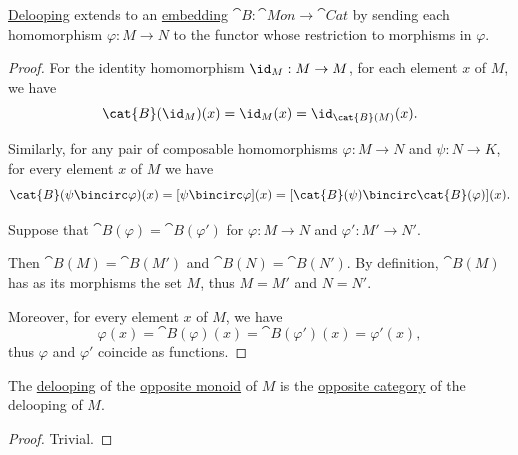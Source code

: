 \begin{proposition}\label{thm:delooping_as_functor}
  \hyperref[def:monoid_delooping]{Delooping} extends to an \hyperref[def:functor_invertibility/injective]{embedding} \( \cat{B}: \cat{Mon} \to \cat{Cat} \) by sending each homomorphism \( \varphi: M \to N \) to the functor whose restriction to morphisms in \( \varphi \).
\end{proposition}
\begin{proof}
   For the identity homomorphism \( \id_M: M \to M \), for each element \( x \) of \( M \), we have
  \begin{equation*}
    \cat{B}(\id_M)(x) = \id_M(x) = \id_{\cat{B}(M)}(x).
  \end{equation*}

   Similarly, for any pair of composable homomorphisms \( \varphi: M \to N \) and \( \psi: N \to K \), for every element \( x \) of \( M \) we have
  \begin{equation*}
    \cat{B}(\psi \bincirc \varphi)(x) = [\psi \bincirc \varphi](x) = [\cat{B}(\psi) \bincirc \cat{B}(\varphi)](x).
  \end{equation*}

   Suppose that \( \cat{B}(\varphi) = \cat{B}(\varphi') \) for \( \varphi: M \to N \) and \( \varphi': M' \to N' \).

  Then \( \cat{B}(M) = \cat{B}(M') \) and \( \cat{B}(N) = \cat{B}(N') \). By definition, \( \cat{B}(M) \) has as its morphisms the set \( M \), thus \( M = M' \) and \( N = N' \).

  Moreover, for every element \( x \) of \( M \), we have
  \begin{equation*}
    \varphi(x) = \cat{B}(\varphi)(x) = \cat{B}(\varphi')(x) = \varphi'(x),
  \end{equation*}
  thus \( \varphi \) and \( \varphi' \) coincide as functions.
\end{proof}

\begin{proposition}\label{thm:delooping_of_opposite_monoid}
  The \hyperref[def:monoid_delooping]{delooping} of the \hyperref[def:monoid/opposite]{opposite monoid} of \( M \) is the \hyperref[def:opposite_category]{opposite category} of the delooping of \( M \).
\end{proposition}
\begin{proof}
  Trivial.
\end{proof}

